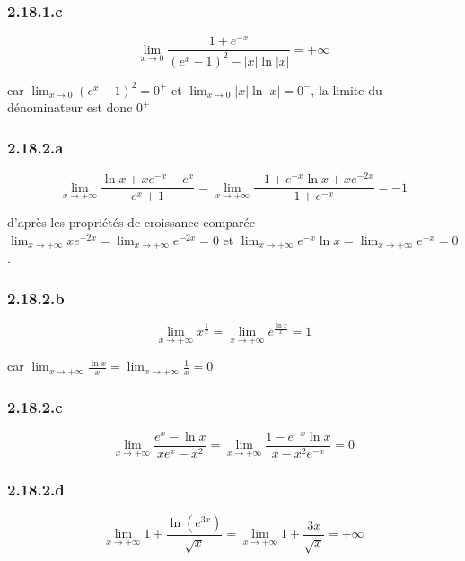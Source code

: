 \documentclass{report}
\begin{document}
\subsubsection*{2.18.1.c}
\begin{displaymath}
	\lim_{x \rightarrow 0} \frac{1+e^{-x}}{(e^x-1)^2 - |x|\ln |x|} = + \infty
\end{displaymath}

car $ \lim_{x \rightarrow 0} (e^x-1)^2 = 0^{+}$ et $ \lim_{x \rightarrow 0} |x|\ln |x| = 0^{-}$, la limite du dénominateur est donc $0^{+}$

\subsubsection*{2.18.2.a}
\begin{displaymath}
	\lim_{x \rightarrow +\infty} \frac{\ln x + xe^{-x}-e^x}{e^x+1} = \lim_{x \rightarrow +\infty} \frac{-1 + e^{-x}\ln x + xe^{-2x}}{1 +e^{-x}} = -1
\end{displaymath}

d'après les propriétés de croissance comparée $\lim_{x \rightarrow +\infty} xe^{-2x} = \lim_{x \rightarrow +\infty} e^{-2x} = 0$ et 
$\lim_{x \rightarrow +\infty} e^{-x}\ln x = \lim_{x \rightarrow +\infty} e^{-x} =0 $.

\subsubsection*{2.18.2.b}
\begin{displaymath}
	\lim_{x \rightarrow +\infty} x^{\frac{1}{x}} = \lim_{x \rightarrow +\infty} e^\frac{\ln x}{x} = 1
\end{displaymath}

car $\lim_{x \rightarrow +\infty} \frac{\ln x}{x} = \lim_{x \rightarrow +\infty} \frac{1}{x} = 0$

\subsubsection*{2.18.2.c}
\begin{displaymath}
	\lim_{x \rightarrow +\infty} \frac{e^x - \ln x}{xe^x-x^2} = \lim_{x \rightarrow +\infty} \frac{1 - e^{-x}\ln x}{x-x^2e^{-x}} = 0
\end{displaymath}

\subsubsection*{2.18.2.d}
\begin{displaymath}
	\lim_{x \rightarrow +\infty} 1+ \frac{\ln (e^{3x})}{\sqrt{x}} = \lim_{x \rightarrow +\infty} 1+ \frac{3x}{\sqrt{x}} = +\infty
\end{displaymath}
\end{document}
